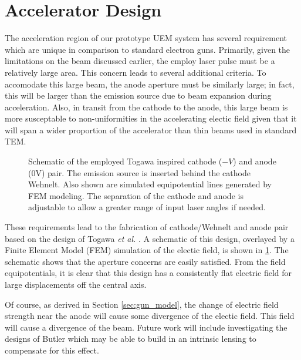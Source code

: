 \section{Accelerator Design} \label{sec:gun_design}

The acceleration region of our prototype UEM system has several requirement which are unique in comparison to standard electron guns.
Primarily, given the limitations on the beam discussed earlier, %
the employ laser pulse must be a relatively large area.
This concern leads to several additional criteria.
To accomodate this large beam, the anode aperture must be similarly large; in fact, this will be larger than the emission source due to beam expansion during acceleration.
Also, in transit from the cathode to the anode, this large beam is more susceptable to non-uniformities in the accelerating electic field given that it will span a wider proportion of the accelerator than thin beams used in standard TEM.

\begin{figure}
  \centering
  
  \caption{
    Schematic of the employed Togawa inspired cathode ($-V$) and anode (0V) pair.
    The emission source is inserted behind the cathode Wehnelt.
    Also shown are simulated equipotential lines generated by FEM modeling.
    The separation of the cathode and anode is adjustable to allow a greater range of input laser angles if needed. 
  }
  \label{fig:gun-field}
\end{figure}

These requirements lead to the fabrication of cathode/Wehnelt and anode pair based on the design of Togawa \textit{et al.} \cite{togawa_ceb6_2007}.
A schematic of this design, overlayed by a Finite Element Model (FEM) simulation of the electic field, is shown in \ref{fig:gun-field}.
The schematic shows that the aperture concerns are easily satisfied.
From the field equipotentials, it is clear that this design has a consistently flat electric field for large displacements off the central axis.

Of course, as derived in Section \ref{sec:gun_model}, the change of electric field strength near the anode will cause some divergence of the electic field.
This field will cause a divergence of the beam.
Future work will include investigating the designs of Butler %
which may be able to build in an intrinsic lensing to compensate for this effect.

